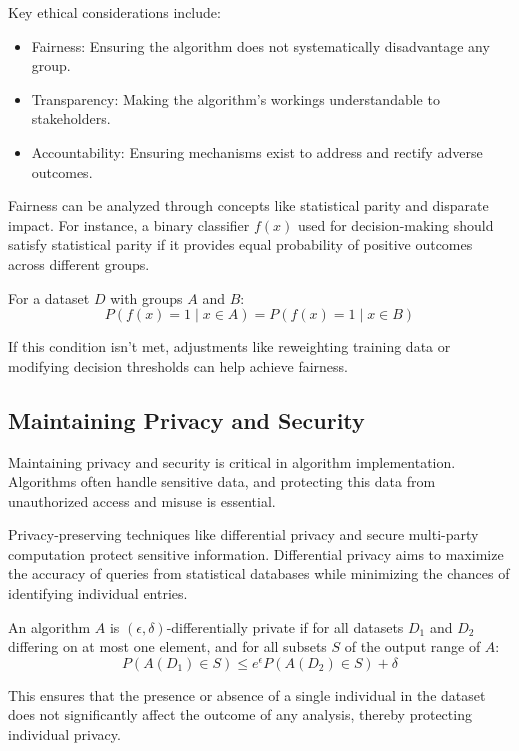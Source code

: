 \documentclass[12pt]{book} %
\begin{document}
Key ethical considerations include:
\begin{itemize}
    \item Fairness: Ensuring the algorithm does not systematically disadvantage any group.
    \item Transparency: Making the algorithm's workings understandable to stakeholders.
    \item Accountability: Ensuring mechanisms exist to address and rectify adverse outcomes.
\end{itemize}

Fairness can be analyzed through concepts like statistical parity and disparate impact. For instance, a binary classifier $f(x)$ used for decision-making should satisfy statistical parity if it provides equal probability of positive outcomes across different groups.

For a dataset $D$ with groups $A$ and $B$:
\[ P(f(x) = 1 \mid x \in A) = P(f(x) = 1 \mid x \in B) \]

If this condition isn't met, adjustments like reweighting training data or modifying decision thresholds can help achieve fairness.

\subsection{Maintaining Privacy and Security}
Maintaining privacy and security is critical in algorithm implementation. Algorithms often handle sensitive data, and protecting this data from unauthorized access and misuse is essential.

Privacy-preserving techniques like differential privacy and secure multi-party computation protect sensitive information. Differential privacy aims to maximize the accuracy of queries from statistical databases while minimizing the chances of identifying individual entries.

An algorithm $A$ is $(\epsilon, \delta)$-differentially private if for all datasets $D_1$ and $D_2$ differing on at most one element, and for all subsets $S$ of the output range of $A$:
\[ P(A(D_1) \in S) \leq e^\epsilon P(A(D_2) \in S) + \delta \]

This ensures that the presence or absence of a single individual in the dataset does not significantly affect the outcome of any analysis, thereby protecting individual privacy.
\end{document}
